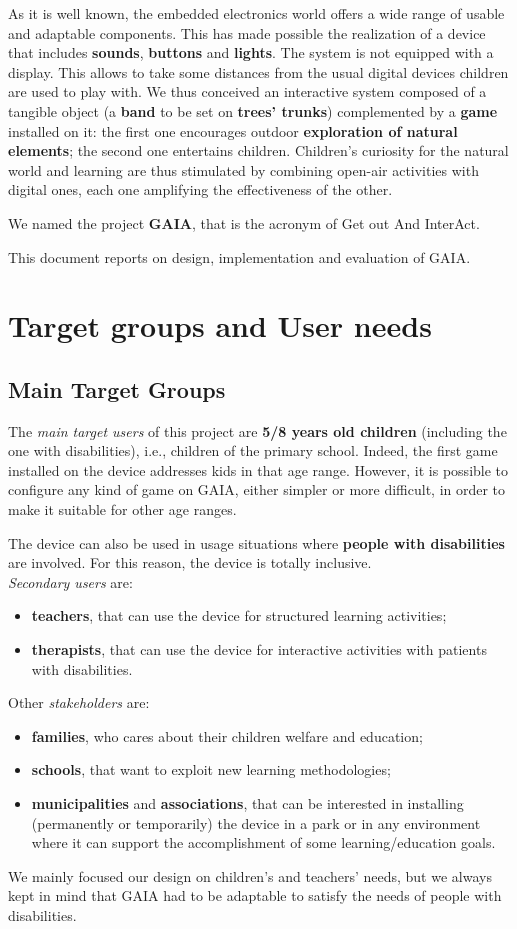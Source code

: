 \documentclass[a4paper,11pt]{report}
\begin{document}
As it is well known, the embedded electronics world offers a wide range of usable and adaptable components. This has made possible the realization of a device that includes \textbf{sounds}, \textbf{buttons} and \textbf{lights}. The system is not equipped with a display. This allows to take some distances from the usual digital devices children are used to play with. We thus conceived an interactive system composed of a tangible object (a \textbf{band} to be set on \textbf{trees' trunks}) complemented by a \textbf{game} installed on it: the first one encourages outdoor \textbf{exploration of natural elements}; the second one entertains children. Children's curiosity for the natural world and learning are thus stimulated by combining open-air activities with digital ones, each one amplifying the effectiveness of the other.\par
We named the project \textbf{GAIA}, that is the acronym of Get out And InterAct.\par
This document reports on design, implementation and evaluation of GAIA.
\chapter{Target groups and User needs}
\section{Main Target Groups}
The \emph{main target users} of this project are \textbf{5/8 years old children} (including the one with disabilities), i.e., children of the primary school. Indeed, the first game installed on the device  addresses kids in that age range. However, it is possible to configure any kind of game on GAIA, either simpler or more difficult, in order to make it suitable for other age ranges.\par
The device can also be used in usage situations where \textbf{people with disabilities} are involved. For this reason, the device is totally inclusive.\\
\emph{Secondary users} are:
\begin{itemize}
	\item \textbf{teachers}, that can use the device for structured learning activities;
	\item \textbf{therapists}, that can use the device for interactive activities with patients with disabilities.
\end{itemize}	
Other \emph{stakeholders} are:
\begin{itemize}
	\item \textbf{families}, who cares about their children welfare and education;
	\item \textbf{schools}, that want to exploit new learning methodologies;
	\item \textbf{municipalities} and \textbf{associations}, that can be interested in installing (permanently or temporarily) the device in a park or in any environment where it can support the accomplishment of some learning/education goals.
\end{itemize}
We mainly focused our design on children's and teachers' needs, but we always kept in mind that GAIA had to be adaptable to satisfy the needs of people with disabilities.
\end{document}
